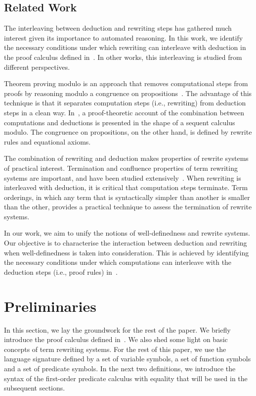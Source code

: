 \documentclass[copyright]{eptcs}
\begin{document}
\subsection{Related Work}
The interleaving between deduction and rewriting steps has gathered much interest given its importance to automated reasoning. In this work, we identify the necessary conditions under which rewriting can interleave with deduction in the proof calculus defined in~\cite{icfemMehta08}. In other works, this interleaving is studied from different perspectives.
\par
Theorem proving modulo is an approach that removes computational steps from proofs by reasoning modulo a congruence on propositions~\cite{949773}. The advantage of this technique is that it separates computation steps (i.e., rewriting) from deduction steps in a clean way. In~\cite{949773}, a proof-theoretic account of the combination between computations and deductions is presented in the shape of a sequent calculus modulo. The congruence on propositions, on the other hand, is defined by rewrite rules and equational axioms.
\par
The combination of rewriting and deduction makes properties of rewrite systems of practical interest. Termination and confluence properties of term rewriting systems are important, and have been studied extensively~\cite{280474,303448}. When rewriting is interleaved with deduction, it is critical that computation steps terminate. Term orderings, in which any term that is syntactically simpler than another is smaller than the other, provides a practical technique to assess the termination of rewrite systems.
\par
In our work, we aim to unify the notions of well-definedness and rewrite systems. Our objective is to characterise the interaction between deduction and rewriting when well-definedness is taken into consideration. This is achieved by identifying the necessary conditions under which computations can interleave with the deduction steps (i.e., proof rules) in~\cite{icfemMehta08}.

\section{Preliminaries}\label{pre}
In this section, we lay the groundwork for the rest of the paper. We briefly introduce the proof calculus defined in~\cite{icfemMehta08}. We also shed some light on basic concepts of term rewriting systems. For the rest of this paper, we use the language signature  defined by a set  of variable symbols, a set  of function symbols and a set  of predicate symbols. In the next two definitions, we introduce the syntax of the first-order predicate calculus with equality that will be used in the subsequent sections.
\end{document}
